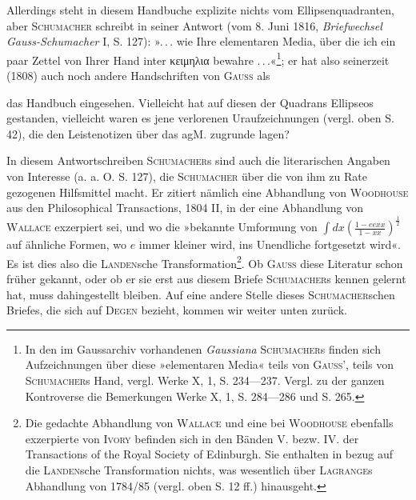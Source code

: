 Allerdings steht in diesem Handbuche explizite nichts vom Ellipsenquadranten,
aber \textsc{Schumacher} schreibt in seiner Antwort (vom 8. Juni 1816,
\textit{Briefwechsel Gauss-Schumacher} I, S. 127): »\mbox{.\,.\,.} wie Ihre elementaren Media,
über die ich ein paar Zettel von Ihrer Hand inter {κειμηλια} bewahre \mbox{.\,.\,.}«\footnote{In den im Gaussarchiv vorhandenen \textit{Gaussiana} \textsc{Schumacher}s finden sich Aufzeichnungen über diese »elementaren Media« teils von \textsc{Gauss}', teils von \textsc{Schumacher}s Hand, vergl. Werke X, 1, S. 234—237. Vergl. zu der ganzen Kontroverse die Bemerkungen Werke X, 1, S. 284—286 und S. 265.};
er hat also seinerzeit (1808) auch noch andere Handschriften von \textsc{Gauss} als
\par\clearpage{}
\noindent das Handbuch eingesehen. Vielleicht hat auf diesen der Quadrans Ellipseos
gestanden, vielleicht waren es jene verlorenen Uraufzeichnungen (vergl. oben
S. 42), die den Leistenotizen über das agM. zugrunde lagen?

In diesem Antwortschreiben \textsc{Schumacher}s sind auch die literarischen Angaben
von Interesse (a. a. O. S. 127), die \textsc{Schumacher} über die von ihm zu
Rate gezogenen Hilfsmittel macht. Er zitiert nämlich eine Abhandlung von
\textsc{Woodhouse} aus den Philosophical Transactions, 1804 II, in der eine Abhandlung
von \textsc{Wallace} exzerpiert sei, und wo die »bekannte Umformung von
\(\int dx\left(\frac{1-eexx}{1-xx}\right)^{\frac12}\) auf ähnliche Formen, wo \(e\) immer kleiner wird, ins Unendliche
fortgesetzt wird«. Es ist dies also die \textsc{Landen}sche Transformation\footnote{Die gedachte Abhandlung von \textsc{Wallace} und eine bei \textsc{Woodhouse} ebenfalls exzerpierte von \textsc{Ivory} befinden sich in den Bänden V. bezw. IV. der Transactions of the Royal Society of Edinburgh. Sie enthalten in bezug auf die \textsc{Landen}sche Transformation nichts, was wesentlich über \textsc{Lagrange}s Abhandlung von 1784/85 (vergl. oben S. 12 ff.) hinausgeht.}. Ob
\textsc{Gauss} diese Literatur schon früher gekannt, oder ob er sie erst aus diesem
Briefe \textsc{Schumacher}s kennen gelernt hat, muss dahingestellt bleiben. Auf eine
andere Stelle dieses \textsc{Schumacher}schen Briefes, die sich auf \textsc{Degen} bezieht,
kommen wir weiter unten zurück.

